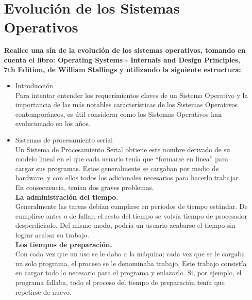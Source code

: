 \section{Evoluci\'on de los Sistemas Operativos}

	\textbf{Realice una sín de la evolución de los sistemas operativos, tomando en cuenta el libro: Operating Systems - Internals and Design Principles, 7th Edition, de William Stallings y utilizando la siguiente estructura:}

	\begin{itemize}

		\item Introducción\\
		Para intentar entender los requerimientos claves de un Sistema Operativo y la importancia de las más notables características de los Sistemas Operativos contemporáneos, es útil considerar como los Sistemas Operativos han evolucionado en los años.
		
		\item Sistemas de procesamiento serial\\
		
		Un Sistema de Procesamiento Serial obtiene este nombre derivado de su modelo lineal en el que cada usuario tenía que “formarse en línea” para cargar sus programas. Estos generalmente se cargaban por medio de hardware, y con ellos todos los adicionales necesarios para hacerlo trabajar. En consecuencia, tenían dos graves problemas.\\
		\textbf{La administración del tiempo.}\\
		Generalmente las tareas debían cumplirse en periodos de tiempo estándar. De cumplirse antes o de fallar, el resto del tiempo se volvía tiempo de procesador desperdiciado. Del mismo modo, podría un usuario acabarse el tiempo sin lograr acabar su trabajo.\\
		\textbf{Los tiempos de preparación.}\\
		Con cada vez que un uso se le daba a la máquina; cada vez que se le cargaba un solo programa, el proceso se le denominaba trabajo. Este trabajo consistía en cargar todo lo necesario para el programa y enlazarlo. Si, por ejemplo, el programa fallaba, todo el proceso del tiempo de preparación tenía que repetirse de nuevo.
		

\end{itemize}
